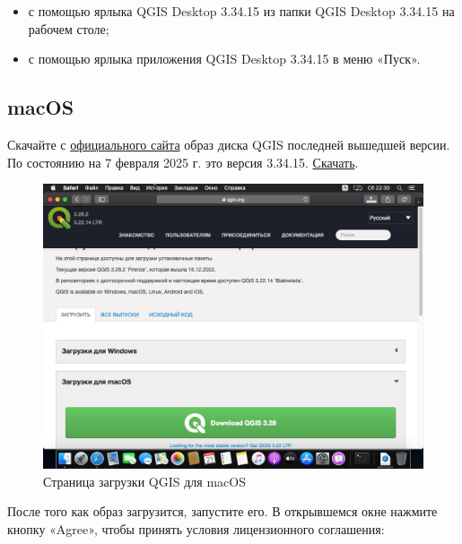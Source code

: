 \documentclass[
  12pt,
]{book}
\providecommand{\tightlist}{%
  \setlength{\itemsep}{0pt}\setlength{\parskip}{0pt}}
\begin{document}
\begin{itemize}
\tightlist
\item
  с помощью ярлыка QGIS Desktop 3.34.15 из папки QGIS Desktop 3.34.15 на рабочем столе;
\item
  с помощью ярлыка приложения QGIS Desktop 3.34.15 в меню «Пуск».
\end{itemize}

\subsection*{macOS}\label{macos}

Скачайте с \href{https://www.kyngchaos.com/files/software/qgis/QGIS-macOS-3.4.12-1.dmg}{официального сайта} образ диска QGIS последней вышедшей версии. По состоянию на 7 февраля 2025 г. это версия 3.34.15. \href{https://qgis.org/downloads/macos/qgis-macos-pr.dmg}{Скачать}.

\begin{figure}
\centering
\includegraphics{images/Index0/mac01.png}
\caption{Страница загрузки QGIS для macOS}
\end{figure}

После того как образ загрузится, запустите его. В открывшемся окне нажмите кнопку «Agree», чтобы принять условия лицензионного соглашения:
\end{document}
